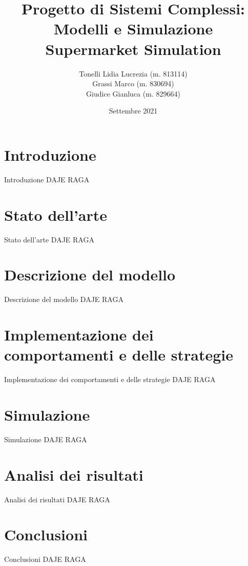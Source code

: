 \documentclass[11pt]{beamer}
\author{Tonelli Lidia Lucrezia (m. 813114) \\ Grassi Marco (m. 830694) \\ Giudice Gianluca (m. 829664)}
\title{Progetto di Sistemi Complessi: Modelli e Simulazione\\Supermarket Simulation}
\institute[University of Milano Bicocca] 
{
University of Milano Bicocca \\ 
\medskip
}
\date{Settembre 2021}
\begin{document}
\begin{frame}
\titlepage
\end{frame}

\begin{frame}
\tableofcontents
\end{frame}

\section{Introduzione}
\begin{frame}{Introduzione}
\centering
DAJE RAGA
\end{frame}

\section{Stato dell'arte}
\begin{frame}{Stato dell'arte}
\centering
DAJE RAGA
\end{frame}

\section{Descrizione del modello}
\begin{frame}{Descrizione del modello}
\centering
DAJE RAGA
\end{frame}

\section{Implementazione dei comportamenti e delle strategie}
\begin{frame}{Implementazione dei comportamenti e delle strategie}
\centering
DAJE RAGA
\end{frame}

\section{Simulazione}
\begin{frame}{Simulazione}
\centering
DAJE RAGA
\end{frame}

\section{Analisi dei risultati}
\begin{frame}{Analisi dei risultati}
\centering
DAJE RAGA
\end{frame}

\section{Conclusioni}
\begin{frame}{Conclusioni}
\centering
DAJE RAGA
\end{frame}
\end{document}

